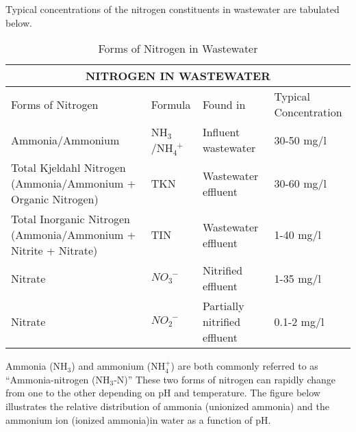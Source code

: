 	Typical concentrations of the nitrogen constituents in wastewater are tabulated below.\\

\setlength{\arrayrulewidth}{0.6mm}
\setlength{\tabcolsep}{8 pt}
\renewcommand{\arraystretch}{1.2}
	\begin{center}
	\begin{table}
		\begin{tabular}{ |p{6.5cm}|p{2.0cm}|p{2.5cm}|p{2.5cm}|}
			\hline
			\multicolumn{4}{|c|}{\textbf{NITROGEN IN WASTEWATER}} \\
			\hline

			\hspace{1.8 cm}Forms of Nitrogen & \hspace{0.25 cm} Formula & \hspace{.4 cm} Found in & \hspace{.4 cm} Typical \newline \hspace{.2 cm}Concentration\\
			\hline
			\small Ammonia/Ammonium & \small NH$_3$/NH$_4^{\enspace +}$ &  \small Influent wastewater & 30-50 mg/l\\

			\small Total Kjeldahl Nitrogen \newline  \small (Ammonia/Ammonium + Organic Nitrogen) &  \small TKN &  \small Wastewater \newline  \small effluent  & 30-60 mg/l \\

			 \small Total Inorganic Nitrogen \newline  \small (Ammonia/Ammonium + Nitrite + Nitrate) & \small TIN &  \small  Wastewater \newline  \small effluent  & 1-40 mg/l \\

			 \small Nitrate  & $NO_3^{\enspace -}$ &  \small Nitrified effluent &  \small 1-35 mg/l \\

			 \small Nitrate  &  $NO_2^{\enspace -}$ &  \small Partially nitrified effluent &  \small 0.1-2 mg/l \\

			\hline

		\end{tabular}
					\caption{Forms of Nitrogen in Wastewater}
		\end{table}
		
	\end{center}
Ammonia (NH$_3$) and ammonium (NH$_4^+$) are both commonly referred to as “Ammonia-nitrogen (NH$_3$-N)” These two forms of nitrogen can rapidly change from one to the other depending on pH and temperature. The figure below illustrates the relative distribution of ammonia (unionized ammonia) and the ammonium ion (ionized ammonia)in water as a function of pH.\\

